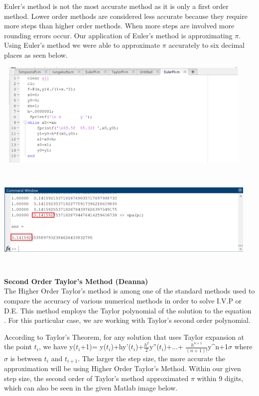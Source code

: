 \documentclass[letterpaper,12pt]{article}
\begin{document}
    \indent Euler's method is not the most accurate method as it is only a first order method. Lower order methods are considered less accurate because they require more steps than higher order methods. When more steps are involved more rounding errors occur. Our application of Euler's method is approximating $\pi$. Using Euler's method we were able to approximate $\pi$ accurately to six decimal places as seen below. 
\begin{center}
    \includegraphics[width=5in, height=2in]{EulerCode.png}
\end{center}
\begin{center}
    \includegraphics[width=5in, height=2in]{EulerResult.png}
\end{center}
    \item \textbf{Second Order Taylor's Method (Deanna)}
    \\\indent The Higher Order Taylor's method is among one of the standard methods used to compare the accuracy of various numerical methods in order to solve I.V.P or D.E. This method employs the Taylor polynomial of the solution to the equation \cite{Sezer07}. For this particular case, we are working with Taylor's second order polynomial. 
    
    \indent According to Taylor's Theorem, for any solution that uses Taylor expansion at the point $t_{i}$, we have 
    y($t_{i}$+1)= y($t_{i}$)+hy'($t_{i}$)+$\tfrac{h^2}{2}$y''($t_{i}$)+...+
    $\tfrac{h^{n+1}}{(n+1)!}$y^{n+1}$\sigma$ where $\sigma$ is between $t_{i}$ and $t_{i+1}$. The larger the step size, the more accurate the approximation will be using Higher Order Taylor's Method. \cite{Atkinson} Within our given step size, the second order of Taylor's method approximated $\pi$ within 9 digits, which can also be seen in the given Matlab image below. 
    
\end{document}

